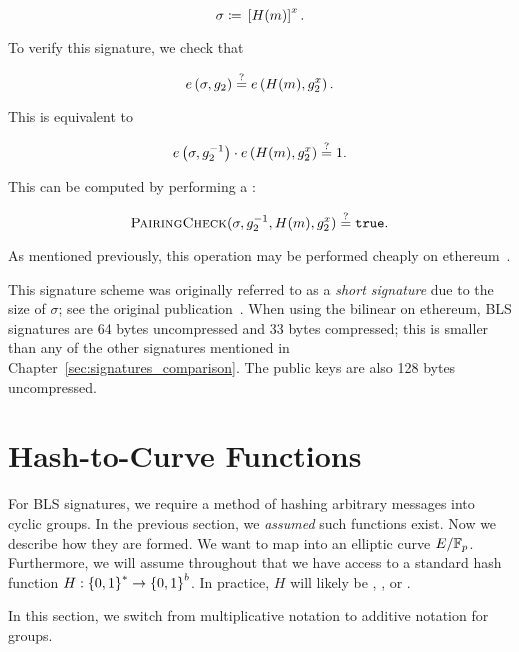 \begin{equation}
    \sigma \coloneqq{} \left[ H(m) \right]^{x}.
\end{equation}

\noindent
To verify this signature, we check that

\begin{equation}
    e\left( \sigma, g_{2} \right) \stackrel{?}{=} e\left( H(m), g_{2}^{x} \right).
\end{equation}

\noindent
This is equivalent to

\begin{equation}
    e\left( \sigma, g_{2}^{-1} \right) \cdot e\left( H(m), g_{2}^{x} \right)
        \stackrel{?}{=} 1.
\end{equation}

\noindent
This can be computed by performing a \PairingCheck{}:

\begin{equation}
    \textsc{PairingCheck}{}(\sigma, g_{2}^{-1}, H(m), g_{2}^{x})
        \stackrel{?}{=} \texttt{true}.
\end{equation}

\noindent
As mentioned previously, this operation may be performed
cheaply on \gls{ethereum}~\cite{EthereumYellowpaper}.

This signature scheme was originally referred to as a \emph{short signature}
due to the size of $\sigma$; see the original publication~\cite{BLSSignatures}.
When using the \gls{bilinear} on \gls{ethereum},
BLS signatures are 64 bytes uncompressed and 33 bytes compressed;
this is smaller than any of the other signatures mentioned in
Chapter~\ref{sec:signatures_comparison}.
The public keys are also 128 bytes uncompressed.



\section{Hash-to-Curve Functions}

For BLS signatures, we require a method of hashing arbitrary messages
into \glspl{cyclic group}.
In the previous section, we \emph{assumed} such functions exist.
Now we describe how they are formed.
We want to map into an \gls{elliptic curve} $E/\mathbb{F}_{p}$.
Furthermore, we will assume throughout that we have access to a standard
\gls{hash function} $H:\left\{ 0,1 \right\}^{*}\to\left\{ 0,1 \right\}^{b}$.
In practice, $H$ will likely be \ShaTwo{}, \ShaThree{},
or \Keccak{}.

In this section, we switch from multiplicative notation
to additive notation for \glspl{group}.

